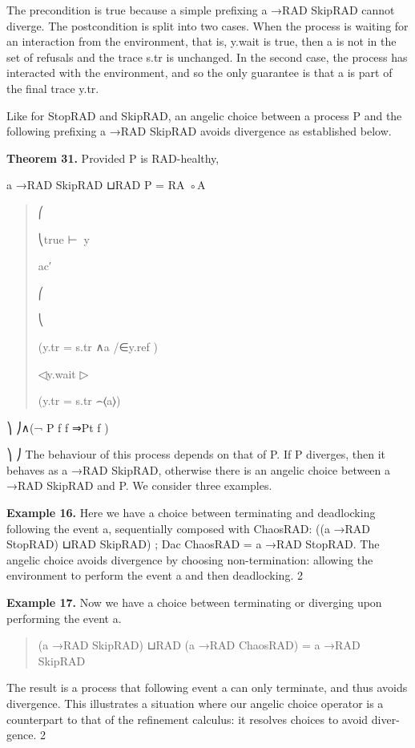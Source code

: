 \documentclass[11pt]{article}
\begin{document}
The precondition is true because a simple prefixing a →RAD SkipRAD cannot diverge. The postcondition is split into two cases. When the process is waiting for an interaction from the environment, that is, y.wait is true, then a is not in the set of refusals and the trace s.tr is unchanged. In the second case, the process has interacted with the environment, and so the only guarantee is that a is part of the final trace y.tr.

Like for StopRAD and SkipRAD, an angelic choice between a process P and the following prefixing a →RAD SkipRAD avoids divergence as established below.

\noindent\textbf{Theorem 31.} Provided P is RAD-healthy,


a →RAD SkipRAD ⊔RAD P = RA ◦A

\begin{quote}\small\raggedright
⎛
\par
⎝true ⊢∈⃝y
\par
ac′
\par
⎛
\par
⎝
\par
(y.tr = s.tr ∧a /∈y.ref )
\par
◁y.wait ▷
\par
(y.tr = s.tr ⌢⟨a⟩)
\end{quote}

⎞ ⎠∧(¬ P f f ⇒Pt f )

⎞ ⎠ The behaviour of this process depends on that of P. If P diverges, then it behaves as a →RAD SkipRAD, otherwise there is an angelic choice between a →RAD SkipRAD and P. We consider three examples.

\noindent\textbf{Example 16.} Here we have a choice between terminating and deadlocking following the event a, sequentially composed with ChaosRAD: ((a →RAD StopRAD) ⊔RAD SkipRAD) ; Dac ChaosRAD = a →RAD StopRAD. The angelic choice avoids divergence by choosing non-termination: allowing the environment to perform the event a and then deadlocking. 2


\noindent\textbf{Example 17.} Now we have a choice between terminating or diverging upon performing the event a.


\begin{quote}\small\raggedright
(a →RAD SkipRAD) ⊔RAD (a →RAD ChaosRAD) = a →RAD SkipRAD
\end{quote}

The result is a process that following event a can only terminate, and thus avoids divergence. This illustrates a situation where our angelic choice operator is a counterpart to that of the refinement calculus: it resolves choices to avoid diver- gence. 2
\end{document}
